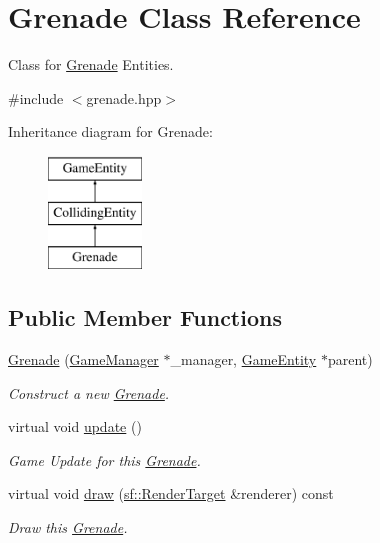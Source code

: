 \hypertarget{class_grenade}{}\section{Grenade Class Reference}
\label{class_grenade}


Class for \mbox{\hyperlink{class_grenade}{Grenade}} Entities.  




{\ttfamily \#include $<$grenade.\+hpp$>$}

Inheritance diagram for Grenade\+:\begin{figure}[H]
\begin{center}
\leavevmode
\includegraphics[height=3.000000cm]{class_grenade}
\end{center}
\end{figure}
\subsection*{Public Member Functions}
\begin{DoxyCompactItemize}
\item 
\mbox{\hyperlink{class_grenade_aaf9345e712698ba13c2a4eaa381cf018}{Grenade}} (\mbox{\hyperlink{class_game_manager}{Game\+Manager}} $\ast$\+\_\+manager, \mbox{\hyperlink{class_game_entity}{Game\+Entity}} $\ast$parent)
\begin{DoxyCompactList}\small\item\em Construct a new \mbox{\hyperlink{class_grenade}{Grenade}}. \end{DoxyCompactList}\item 
\mbox{\label{class_grenade_a619439a6446a856fd5f4116a767fd06c}} 
virtual void \mbox{\hyperlink{class_grenade_a619439a6446a856fd5f4116a767fd06c}{update}} ()
\begin{DoxyCompactList}\small\item\em Game Update for this \mbox{\hyperlink{class_grenade}{Grenade}}. \end{DoxyCompactList}\item 
virtual void \mbox{\hyperlink{class_grenade_abfdaf27e6b0182fe6f515cbdd86be1a8}{draw}} (\mbox{\hyperlink{classsf_1_1_render_target}{sf\+::\+Render\+Target}} \&renderer) const
\begin{DoxyCompactList}\small\item\em Draw this \mbox{\hyperlink{class_grenade}{Grenade}}. \end{DoxyCompactList}\end{DoxyCompactItemize}
